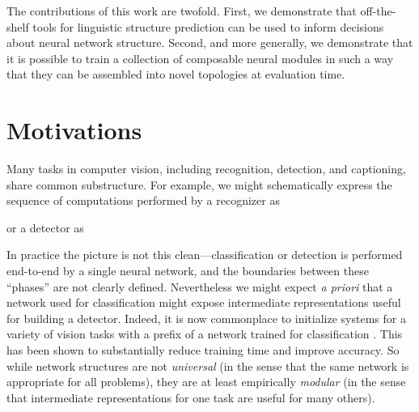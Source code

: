 \documentclass[10pt,twocolumn,letterpaper]{article}
\begin{document}
The contributions of this work are twofold. First, we demonstrate
that off-the-shelf tools for linguistic structure prediction can be used to
inform decisions about neural network structure. Second, and more
generally, we demonstrate that it is possible to train a collection of composable neural
modules in such a way that they can be assembled into novel topologies at
evaluation time.

\section{Motivations}

Many tasks in computer vision, including recognition, detection, and captioning,
share common substructure. For example, we might schematically express the
sequence of computations performed by a recognizer as
\begin{flushleft}
\end{flushleft}
or a detector as
\begin{flushleft}
\end{flushleft}

In practice the picture is not this clean---classification or detection is
performed end-to-end by a single neural network, and the boundaries between
these ``phases'' are not clearly defined. Nevertheless we might expect \textit{a
priori} that a network used for classification might expose intermediate
representations useful for building a detector. Indeed, it is now commonplace to
initialize systems for a variety of vision tasks with a prefix of a network
trained for classification \cite{Long14FullyConvolutional}. This has been shown
to substantially reduce training time and improve accuracy. So while network
structures are not \emph{universal} (in the sense that the same network is
appropriate for all problems), they are at least empirically \emph{modular} (in
the sense that intermediate representations for one task are useful for many
others). 
\end{document}
